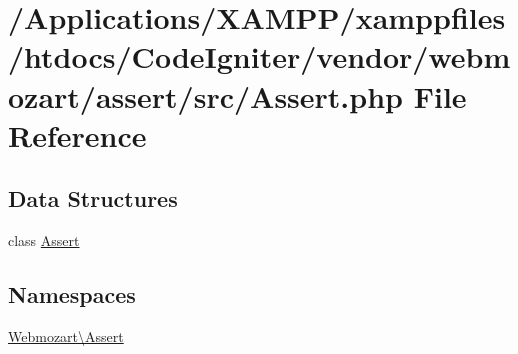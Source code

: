 \hypertarget{webmozart_2assert_2src_2_assert_8php}{}\section{/\+Applications/\+X\+A\+M\+P\+P/xamppfiles/htdocs/\+Code\+Igniter/vendor/webmozart/assert/src/\+Assert.php File Reference}
\label{webmozart_2assert_2src_2_assert_8php}
\subsection*{Data Structures}
\begin{DoxyCompactItemize}
\item 
class \mbox{\hyperlink{class_webmozart_1_1_assert_1_1_assert}{Assert}}
\end{DoxyCompactItemize}
\subsection*{Namespaces}
\begin{DoxyCompactItemize}
\item 
 \mbox{\hyperlink{namespace_webmozart_1_1_assert}{Webmozart\textbackslash{}\+Assert}}
\end{DoxyCompactItemize}
